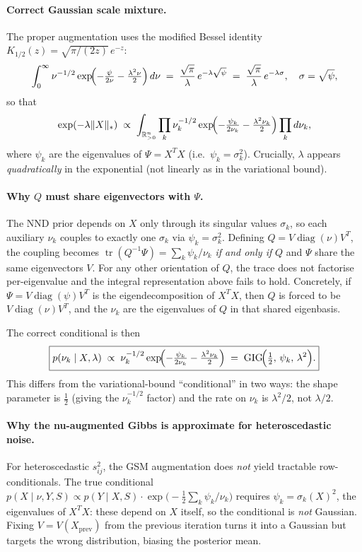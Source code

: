 \documentclass[11pt]{article}
\begin{document}
\paragraph{Correct Gaussian scale mixture.}
\label{sec:gsm-correct}
The proper augmentation uses the modified Bessel identity
$K_{1/2}(z)=\sqrt{\pi/(2z)}\,e^{-z}$:
\[
  \int_0^\infty \nu^{-1/2}
  \exp\!\Bigl(-\tfrac{\psi}{2\nu} - \tfrac{\lambda^2 \nu}{2}\Bigr)\,d\nu
  \;=\; \frac{\sqrt{\pi}}{\lambda}\,e^{-\lambda\sqrt{\psi}}
  \;=\; \frac{\sqrt{\pi}}{\lambda}\,e^{-\lambda\sigma},
  \quad \sigma=\sqrt{\psi},
\]
so that
\[
  \exp(-\lambda\|X\|_*)
  \;\propto\;
  \int_{\mathbb{R}^n_{>0}}
  \prod_k \nu_k^{-1/2}
  \exp\!\Bigl(-\tfrac{\psi_k}{2\nu_k} - \tfrac{\lambda^2 \nu_k}{2}\Bigr)
  \prod_k d\nu_k,
\]
where $\psi_k$ are the eigenvalues of $\Psi=X^TX$ (i.e.\ $\psi_k=\sigma_k^2$).
Crucially, $\lambda$ appears \emph{quadratically} in the exponential
(not linearly as in the variational bound).

\paragraph{Why $Q$ must share eigenvectors with $\Psi$.}
The NND prior depends on $X$ only through its singular values $\sigma_k$,
so each auxiliary $\nu_k$ couples to exactly one $\sigma_k$ via $\psi_k=\sigma_k^2$.
Defining $Q=V\operatorname{diag}(\nu)V^T$, the coupling becomes
$\operatorname{tr}(Q^{-1}\Psi)=\sum_k\psi_k/\nu_k$ \emph{if and only if} $Q$ and $\Psi$
share the same eigenvectors $V$.
For any other orientation of $Q$, the trace does not factorise per-eigenvalue
and the integral representation above fails to hold.
Concretely, if $\Psi=V\operatorname{diag}(\psi)V^T$ is the eigendecomposition of
$X^TX$, then $Q$ is forced to be $V\operatorname{diag}(\nu)V^T$, and the $\nu_k$
are the eigenvalues of $Q$ in that shared eigenbasis.

The correct conditional is then
\[
  \boxed{p(\nu_k\mid X,\lambda)
  \;\propto\; \nu_k^{-1/2}\exp\!\Bigl(-\tfrac{\psi_k}{2\nu_k}-\tfrac{\lambda^2 \nu_k}{2}\Bigr)
  \;=\;\mathrm{GIG}\!\Bigl(\tfrac{1}{2},\,\psi_k,\,\lambda^2\Bigr).}
\]
This differs from the variational-bound ``conditional'' in two ways:
the shape parameter is $\tfrac{1}{2}$ (giving the $\nu_k^{-1/2}$ factor) and the
rate on $\nu_k$ is $\lambda^2/2$, not $\lambda/2$.

\paragraph{Why the nu-augmented Gibbs is approximate for heteroscedastic noise.}
For heteroscedastic $s_{ij}^2$, the GSM augmentation does \emph{not} yield
tractable row-conditionals.  The true conditional
$p(X\mid\nu,Y,S)\propto p(Y\mid X,S)\cdot\exp\!\bigl(-\tfrac{1}{2}\sum_k\psi_k/\nu_k\bigr)$
requires $\psi_k=\sigma_k(X)^2$, the eigenvalues of $X^TX$: these depend on $X$
itself, so the conditional is \emph{not} Gaussian.  Fixing $V=V(X_{\text{prev}})$
from the previous iteration turns it into a Gaussian but targets the wrong
distribution, biasing the posterior mean.
\end{document}

